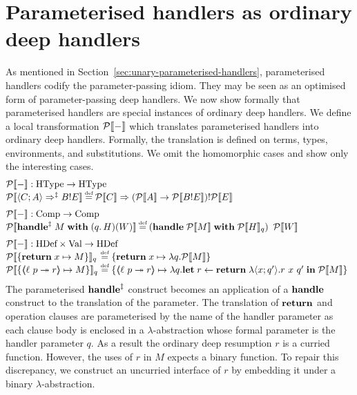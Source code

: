 \documentclass[12pt,phd,lfcs,twoside,openright,logo,leftchapter,normalheadings]{infthesis}
\theoremstyle{plain}
\theoremstyle{definition}
\begin{document}
\section{Parameterised handlers as ordinary deep handlers}
\label{sec:param-desugaring}
\newcommand{\PD}[1]{\mathcal{P}\cps{#1}}
%
As mentioned in Section~\ref{sec:unary-parameterised-handlers},
parameterised handlers codify the parameter-passing idiom. They may be
seen as an optimised form of parameter-passing deep handlers. We now
show formally that parameterised handlers are special instances of
ordinary deep handlers.
%
We define a local transformation $\PD{-}$ which translates
parameterised handlers into ordinary deep handlers. Formally, the
translation is defined on terms, types, environments, and
substitutions. We omit the homomorphic cases and show only the
interesting cases.
%
\[
  \bl
  \PD{-} : \HandlerTypeCat \to \HandlerTypeCat\\
  \PD{\Record{C; A} \Rightarrow^\param B \eff E} \defas \PD{C} \Rightarrow (\PD{A} \to \PD{B \eff E})\eff \PD{E} \medskip\\
  \PD{-} : \CompCat \to \CompCat\\
  \PD{\ParamHandle\;M\;\With\;(q.\,H)(W)} \defas \left(\Handle\; \PD{M}\; \With\; \PD{H}_q\right)~\PD{W} \medskip\\
  \PD{-} : \HandlerCat \times \ValCat \to \HandlerCat\\
  \ba{@{}l@{~}c@{~}l}
  \PD{\{\Return\;x \mapsto M\}}_q &\defas& \{\Return\;x \mapsto \lambda q. \PD{M}\}\\
  \PD{\{\OpCase{\ell}{p}{r} \mapsto M\}}_q &\defas&
      \{\OpCase{\ell}{p}{r} \mapsto \lambda q.
        \Let\; r \revto \Return\;\lambda \Record{x;q'}. r~x~q'\;
        \In\; \PD{M}\}
  \ea
 \el
\]
%
The parameterised $\mathbf{handle}^{\ddagger}$ construct becomes an application of a
$\mathbf{handle}$ construct to the translation of the parameter. The
translation of $\mathbf{return}$ and operation clauses are parameterised by
the name of the handler parameter as each clause body is enclosed in a
$\lambda$-abstraction whose formal parameter is the handler parameter
$q$. As a result the ordinary deep resumption $r$ is a curried
function. However, the uses of $r$ in $M$ expects a binary
function. To repair this discrepancy, we construct an uncurried
interface of $r$ by embedding it under a binary $\lambda$-abstraction.
%
\end{document}
